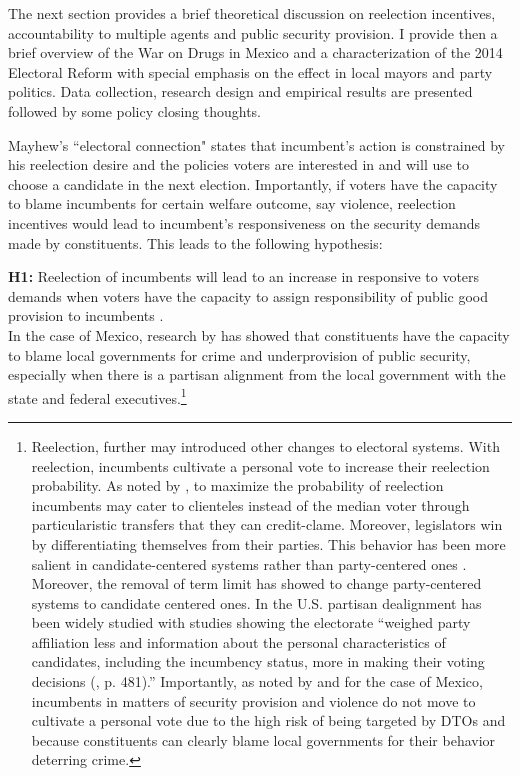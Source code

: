\documentclass[12pt]{amsart}
\makeatletter
\def\section{\@startsection{section}{1}
	\z@{1.0\linespacing\@plus\linespacing}{.5\linespacing}{\Large}}
\numberwithin{equation}{section}
\theoremstyle{definition}
\theoremstyle{definition}
\theoremstyle{definition}
\makeatother
\begin{document}
The next section provides a brief theoretical discussion on reelection incentives, accountability to multiple agents and public security provision. I provide then a brief overview of the War on Drugs in Mexico and a characterization of the 2014 Electoral Reform with special emphasis on the effect in local mayors and party politics. Data collection, research design and empirical results are presented followed by some policy closing thoughts. 
  
  \section{Argument: an incumbent's divided heart \label{sec:theory}}
  
Mayhew's \citeyear{mayhew_1974} ``electoral connection" states that incumbent's action is constrained by his reelection desire and the policies voters are interested in and will use to choose a candidate in the next election. Importantly, if voters have the capacity to blame incumbents for certain welfare outcome, say violence, reelection incentives would lead to incumbent's responsiveness on the security demands made by constituents. This leads to the following hypothesis:

\bigskip

\textbf{H1:} Reelection of incumbents will lead to an increase in responsive to voters demands when voters have the capacity to assign responsibility of public good provision to incumbents . \\

In the case of Mexico, research by \citep{ley_2017} has showed that constituents have the capacity to blame local governments for crime and underprovision of public security, especially when there is a partisan alignment from the local government with the state and federal executives.\footnote{Reelection, further may introduced other changes to electoral systems. With reelection, incumbents cultivate a personal vote to increase their reelection probability.  As noted by \citet{mayhew_1974}, to maximize the probability of reelection incumbents may cater to clienteles instead of the median voter through particularistic transfers that they can credit-clame. Moreover, legislators win by differentiating themselves from their parties. This behavior has been more salient in candidate-centered systems rather than party-centered ones \citep{carey_shugart_1995, katz_1985}. Moreover, the removal of term limit has showed to change party-centered systems to candidate centered ones. In the U.S. partisan dealignment has been widely studied with studies showing the electorate ``weighed party affiliation less and information about the personal characteristics of candidates, including the incumbency status, more in making their voting decisions (\citet{cox_katz_1996}, p. 481).'' Importantly, as noted by \citet{ley_2017} and \citet{ley_trejo_2020} for the case of Mexico, incumbents in matters of security provision and violence do not move to cultivate a personal vote due to the high risk of being targeted by DTOs and because constituents can clearly blame local governments for their behavior deterring crime.}    
\end{document}

